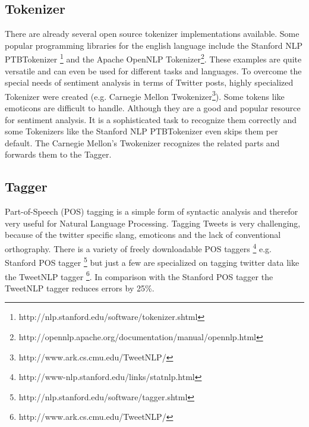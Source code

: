 \subsection{Tokenizer}
There are already several open source tokenizer implementations
available. Some popular programming libraries for the english 
language include the Stanford NLP PTBTokenizer
\footnote{http://nlp.stanford.edu/software/tokenizer.shtml} 
and the Apache OpenNLP Tokenizer\footnote{http://opennlp.apache.org/documentation/manual/opennlp.html}.
These examples are quite versatile and can even be
used for different tasks and languages.
To overcome the special needs of sentiment analysis in terms of Twitter posts,
highly specialized Tokenizer were created (e.g. Carnegie 
Mellon Twokenizer\footnote{http://www.ark.cs.cmu.edu/TweetNLP/}).
Some tokens like emoticons are difficult to handle. Although they 
are a good and popular resource for sentiment analysis. \autocite{emoticons}
It is a sophisticated task to recognize them correctly and some Tokenizers 
like the Stanford NLP PTBTokenizer even skips them per default. 
The Carnegie Mellon's Twokenizer recognizes the related parts and
forwards them to the Tagger.

\subsection{Tagger}
Part-of-Speech (POS) tagging is a simple form of syntactic analysis and therefor
very useful for Natural Language Processing.
Tagging Tweets is very challenging, because of the twitter specific slang, emoticons and the lack of conventional orthography.
There is a variety of freely downloadable POS taggers
\footnote{http://www-nlp.stanford.edu/links/statnlp.html} e.g. Stanford POS tagger
\footnote{http://nlp.stanford.edu/software/tagger.shtml}
 but just a few are specialized on tagging twitter data like the TweetNLP tagger
\footnote{http://www.ark.cs.cmu.edu/TweetNLP/}. In comparison with the Stanford POS tagger the TweetNLP tagger
 reduces errors by 25\%.


